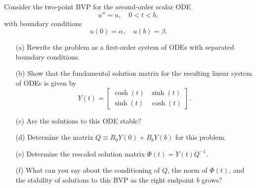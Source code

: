 \begin{pro}
  Consider the two-point BVP for the second-order scalar ODE
  \begin{displaymath}
    u'' = u, \quad 0<t<b,
  \end{displaymath}
  with boundary conditions
  \begin{displaymath}
    u(0)=\alpha, \quad u(b) = \beta.
  \end{displaymath}
  \begin{itemize}
  \item[(a)]
    Rewrite the problem as a first-order system of ODEs with
    separated boundary conditions.

  \item[(b)]
    Show that the fundamental solution matrix for the resulting linear
    system of ODEs is given by
    \begin{displaymath}
      Y(t) =
      \begin{bmatrix}
        \cosh(t) & \sinh(t) \\
        \sinh(t) & \cosh(t)
      \end{bmatrix}.
    \end{displaymath}

  \item[(c)]
    Are the solutions to this ODE stable?

  \item[(d)]
    Determine the matrix $Q\equiv B_0Y(0)+B_bY(b)$
    for this problem.

  \item[(e)]
    Determine the rescaled solution matrix
    $\Phi(t) = Y(t)Q^{-1}$.

  \item[(f)]
    What can you say about the conditioning of $Q$,
    the norm of $\Phi(t)$,
    and the stability of solutions to this BVP as the right endpoint $b$ grows?
  \end{itemize}
\end{pro}

